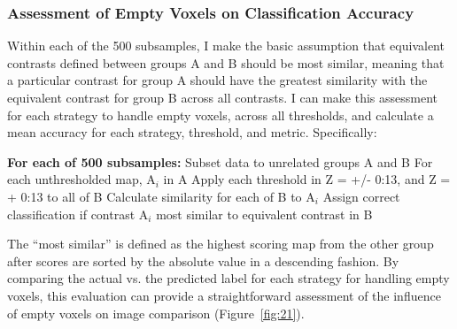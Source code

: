 \documentclass{report}
\begin{document}
\subsubsection{Assessment of Empty Voxels on Classification Accuracy}

Within each of the 500 subsamples, I make the basic assumption that
equivalent contrasts defined between groups A and B should be most
similar, meaning that a particular contrast for group A should have the
greatest similarity with the equivalent contrast for group B across all
contrasts. I can make this assessment for each strategy to handle empty
voxels, across all thresholds, and calculate a mean accuracy for each
strategy, threshold, and metric. Specifically: \newline \newline

\textbf{For each of 500 subsamples:} \newline
\indent \indent Subset data to unrelated groups A and B \newline
\indent \indent For each unthresholded map, A$_{i}$ in A \newline
\indent \indent \indent Apply each threshold in Z = +/- 0:13, and Z = + 0:13 to all of B \newline
\indent \indent \indent Calculate similarity for each of B to A$_{i}$   \newline  
\indent \indent \indent Assign correct classification if contrast A$_{i}$ most similar to equivalent contrast in B \newline \newline


The ``most similar'' is defined as the highest scoring map from the
other group after scores are sorted by the absolute value in a
descending fashion. By comparing the actual vs. the predicted label for
each strategy for handling empty voxels, this evaluation can provide a
straightforward assessment of the influence of empty voxels on image
comparison (Figure~\ref{fig:21}).
\end{document}
